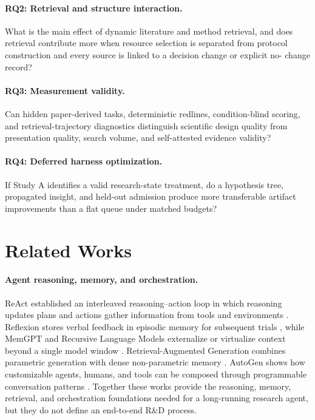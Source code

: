 \documentclass[11pt,a4paper]{article}
\begin{document}
\paragraph{RQ2: Retrieval and structure interaction.}
What is the main effect of dynamic literature and method retrieval, and does
retrieval contribute more when resource selection is separated from protocol
construction and every source is linked to a decision change or explicit no-
change record?

\paragraph{RQ3: Measurement validity.}
Can hidden paper-derived tasks, deterministic redlines, condition-blind scoring,
and retrieval-trajectory diagnostics distinguish scientific design quality from
presentation quality, search volume, and self-attested evidence validity?

\paragraph{RQ4: Deferred harness optimization.}
If Study A identifies a valid research-state treatment, do a hypothesis tree,
propagated insight, and held-out admission produce more transferable artifact
improvements than a flat queue under matched budgets?

\section{Related Works}

\paragraph{Agent reasoning, memory, and orchestration.}
ReAct established an interleaved reasoning--action loop in which reasoning
updates plans and actions gather information from tools and environments
\citep{react2023}.  Reflexion stores verbal feedback in episodic memory for
subsequent trials \citep{reflexion2023}, while MemGPT and Recursive Language
Models externalize or virtualize context beyond a single model window
\citep{memgpt2023,rlm2025}.  Retrieval-Augmented Generation combines parametric
generation with dense non-parametric memory \citep{rag2020}.  AutoGen shows how
customizable agents, humans, and tools can be composed through programmable
conversation patterns \citep{autogen2023}.  Together these works provide the
reasoning, memory, retrieval, and orchestration foundations needed for a
long-running research agent, but they do not define an end-to-end R\&D process.
\end{document}
